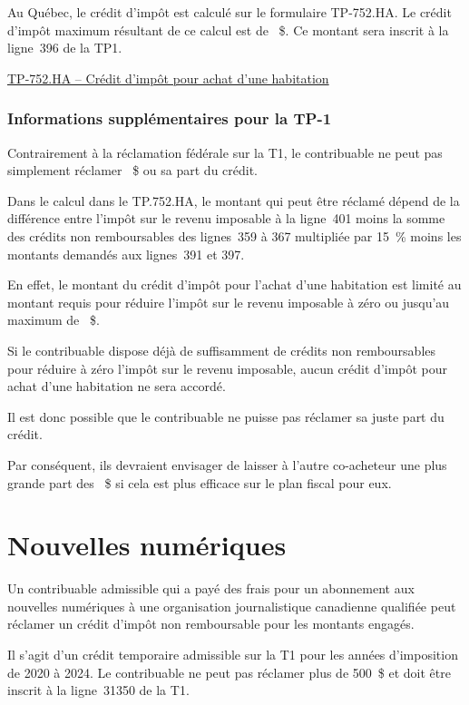 Au Québec, le crédit d'impôt est calculé sur le formulaire TP-752.HA. Le crédit d'impôt maximum résultant de ce calcul est de ~\$. Ce montant sera inscrit à la ligne~396 de la TP1.

\qct\href{https://www.revenuquebec.ca/fr/services-en-ligne/formulaires-et-publications/details-courant/tp-752-ha/}{TP-752.HA -- Crédit d'impôt pour achat d'une habitation}

\subsubsection{Informations supplémentaires pour la TP-1}
Contrairement à la réclamation fédérale sur la T1, le contribuable ne peut pas simplement réclamer ~\$ ou sa part du crédit.

Dans le calcul dans le TP.752.HA, le montant qui peut être réclamé dépend de la différence entre l'impôt sur le revenu imposable à la ligne~401 moins la somme des crédits non remboursables des lignes~359 à 367 multipliée par 15~\% moins les montants demandés aux lignes~391 et 397.

En effet, le montant du crédit d'impôt pour l'achat d'une habitation est limité au montant requis pour réduire l'impôt sur le revenu imposable à zéro ou jusqu'au maximum de ~\$.

Si le contribuable dispose déjà de suffisamment de crédits non remboursables pour réduire à zéro l'impôt sur le revenu imposable, aucun crédit d'impôt pour achat d'une habitation ne sera accordé.

Il est donc possible que le contribuable ne puisse pas réclamer sa juste part du crédit.

Par conséquent, ils devraient envisager de laisser à l'autre co-acheteur une plus grande part des ~\$ si cela est plus efficace sur le plan fiscal pour eux.



\section{Nouvelles numériques}
\begin{intro}
	Un contribuable admissible qui a payé des frais pour un abonnement aux nouvelles numériques à une organisation journalistique canadienne qualifiée peut réclamer un crédit d'impôt non remboursable pour les montants engagés.
\end{intro}

Il s'agit d'un crédit temporaire admissible sur la T1 pour les années d'imposition de 2020 à 2024. Le contribuable ne peut pas réclamer plus de 500~\$ et doit être inscrit à la ligne~31350 de la T1.

